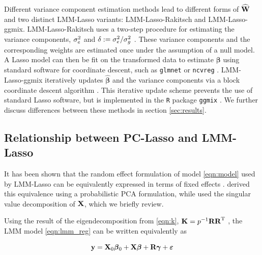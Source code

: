 Different variance component estimation methods lead to different forms of $\widehat{\textbf{W}}$ and two distinct LMM-Lasso variants: LMM-Lasso-Rakitsch and LMM-Lasso-ggmix. LMM-Lasso-Rakitsch uses a two-step procedure for estimating the variance components, $\sigma^2_e$ and $\delta := \sigma^2_e / \sigma^2_g$ \citep{Rakitsch2012}. These variance components and the corresponding weights are estimated once under the assumption of a null model. A Lasso model can then be fit on the transformed data to estimate $\boldsymbol{\beta}$ using standard software for coordinate descent, such as \texttt{glmnet} \citep{glmnet} or \texttt{ncvreg} \citep{ncvreg}. LMM-Lasso-ggmix iteratively updates $\widehat{\boldsymbol{\beta}}$ and the variance components via a block coordinate descent algorithm \citep{bhatnagar2019simultaneous}. This iterative update scheme prevents the use of standard Lasso software, but is implemented in the \texttt{R} package \texttt{ggmix} \citep{ggmix}. We further discuss differences between these methods in section \ref{sec:results}.



\subsection{Relationship between PC-Lasso and LMM-Lasso}

It has been shown that the random effect formulation of model \eqref{eqn:model} used by LMM-Lasso can be equivalently expressed in terms of fixed effects . \citet{zhang2015principal} derived this equivalence using a probabilistic PCA formulation, while \citet{hoffman2013correcting} used the singular value decomposition of $\textbf{X}$, which we briefly review.

Using the result of the eigendecomposition  from \eqref{eqn:k}, $\textbf{K} = p^{-1} \textbf{R} \textbf{R}^{\text{T}}$ , the LMM model \eqref{eqn:lmm_reg} can be written equivalently as

\begin{equation}
    \label{eqn:pc_lmm_equiv}
    \textbf{y} = \textbf{X}_0 \boldsymbol{\beta}{}_0 + \textbf{X} \boldsymbol{\beta}{} + \textbf{R} \boldsymbol{\gamma} + \boldsymbol{\varepsilon}{}
\end{equation}

